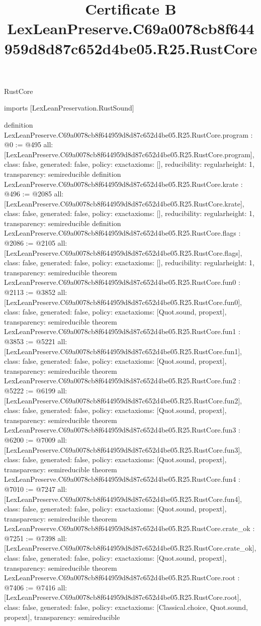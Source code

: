 \begin{lexlean}{RustCore}
\title{Certificate B LexLeanPreserve.C69a0078cb8f644959d8d87c652d4be05.R25.RustCore}
\begin{coremodule}
imports [LexLeanPreservation.RustSound]

definition LexLeanPreserve.C69a0078cb8f644959d8d87c652d4be05.R25.RustCore.program : @0 := @495 {
  all: [LexLeanPreserve.C69a0078cb8f644959d8d87c652d4be05.R25.RustCore.program],
  class: false,
  generated: false,
  policy: exact{axioms: []},
  reducibility: regular{height: 1},
  transparency: semireducible
}
definition LexLeanPreserve.C69a0078cb8f644959d8d87c652d4be05.R25.RustCore.krate : @496 := @2085 {
  all: [LexLeanPreserve.C69a0078cb8f644959d8d87c652d4be05.R25.RustCore.krate],
  class: false,
  generated: false,
  policy: exact{axioms: []},
  reducibility: regular{height: 1},
  transparency: semireducible
}
definition LexLeanPreserve.C69a0078cb8f644959d8d87c652d4be05.R25.RustCore.flags : @2086 := @2105 {
  all: [LexLeanPreserve.C69a0078cb8f644959d8d87c652d4be05.R25.RustCore.flags],
  class: false,
  generated: false,
  policy: exact{axioms: []},
  reducibility: regular{height: 1},
  transparency: semireducible
}
theorem LexLeanPreserve.C69a0078cb8f644959d8d87c652d4be05.R25.RustCore.fun0 : @2113 := @3852 {
  all: [LexLeanPreserve.C69a0078cb8f644959d8d87c652d4be05.R25.RustCore.fun0],
  class: false,
  generated: false,
  policy: exact{axioms: [Quot.sound, propext]},
  transparency: semireducible
}
theorem LexLeanPreserve.C69a0078cb8f644959d8d87c652d4be05.R25.RustCore.fun1 : @3853 := @5221 {
  all: [LexLeanPreserve.C69a0078cb8f644959d8d87c652d4be05.R25.RustCore.fun1],
  class: false,
  generated: false,
  policy: exact{axioms: [Quot.sound, propext]},
  transparency: semireducible
}
theorem LexLeanPreserve.C69a0078cb8f644959d8d87c652d4be05.R25.RustCore.fun2 : @5222 := @6199 {
  all: [LexLeanPreserve.C69a0078cb8f644959d8d87c652d4be05.R25.RustCore.fun2],
  class: false,
  generated: false,
  policy: exact{axioms: [Quot.sound, propext]},
  transparency: semireducible
}
theorem LexLeanPreserve.C69a0078cb8f644959d8d87c652d4be05.R25.RustCore.fun3 : @6200 := @7009 {
  all: [LexLeanPreserve.C69a0078cb8f644959d8d87c652d4be05.R25.RustCore.fun3],
  class: false,
  generated: false,
  policy: exact{axioms: [Quot.sound, propext]},
  transparency: semireducible
}
theorem LexLeanPreserve.C69a0078cb8f644959d8d87c652d4be05.R25.RustCore.fun4 : @7010 := @7247 {
  all: [LexLeanPreserve.C69a0078cb8f644959d8d87c652d4be05.R25.RustCore.fun4],
  class: false,
  generated: false,
  policy: exact{axioms: [Quot.sound, propext]},
  transparency: semireducible
}
theorem LexLeanPreserve.C69a0078cb8f644959d8d87c652d4be05.R25.RustCore.crate_ok : @7251 := @7398 {
  all: [LexLeanPreserve.C69a0078cb8f644959d8d87c652d4be05.R25.RustCore.crate_ok],
  class: false,
  generated: false,
  policy: exact{axioms: [Quot.sound, propext]},
  transparency: semireducible
}
theorem LexLeanPreserve.C69a0078cb8f644959d8d87c652d4be05.R25.RustCore.root : @7406 := @7416 {
  all: [LexLeanPreserve.C69a0078cb8f644959d8d87c652d4be05.R25.RustCore.root],
  class: false,
  generated: false,
  policy: exact{axioms: [Classical.choice, Quot.sound, propext]},
  transparency: semireducible
}


\end{coremodule}
\end{lexlean}
